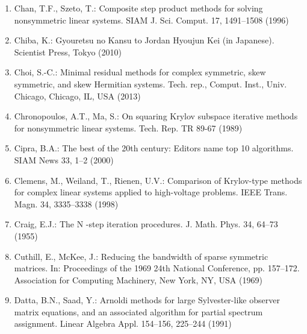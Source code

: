 \begin{enumerate}[label=\arabic*.,ref=\arabic*,leftmargin=3em]
\item\label{bib:source-35}Chan, T.F., Szeto, T.: Composite step product methods for solving nonsymmetric linear systems. SIAM J. Sci. Comput. 17, 1491–1508 (1996)

\item\label{bib:source-36}Chiba, K.: Gyouretsu no Kansu to Jordan Hyoujun Kei (in Japanese). Scientist Press, Tokyo (2010)

\item\label{bib:source-37}Choi, S.-C.: Minimal residual methods for complex symmetric, skew symmetric, and skew Hermitian systems. Tech. rep., Comput. Inst., Univ. Chicago, Chicago, IL, USA (2013)

\item\label{bib:source-38}Chronopoulos, A.T., Ma, S.: On squaring Krylov subspace iterative methods for nonsymmetric linear systems. Tech. Rep. TR 89-67 (1989)

\item\label{bib:source-39}Cipra, B.A.: The best of the 20th century: Editors name top 10 algorithms. SIAM News 33, 1–2 (2000)

\item\label{bib:source-40}Clemens, M., Weiland, T., Rienen, U.V.: Comparison of Krylov-type methods for complex linear systems applied to high-voltage problems. IEEE Trans. Magn. 34, 3335–3338 (1998)

\item\label{bib:source-41}Craig, E.J.: The N -step iteration procedures. J. Math. Phys. 34, 64–73 (1955)

\item\label{bib:source-42}Cuthill, E., McKee, J.: Reducing the bandwidth of sparse symmetric matrices. In: Proceedings of the 1969 24th National Conference, pp. 157–172. Association for Computing Machinery, New York, NY, USA (1969)

\item\label{bib:source-43}Datta, B.N., Saad, Y.: Arnoldi methods for large Sylvester-like observer matrix equations, and an associated algorithm for partial spectrum assignment. Linear Algebra Appl. 154–156, 225–244 (1991)


\end{enumerate}
